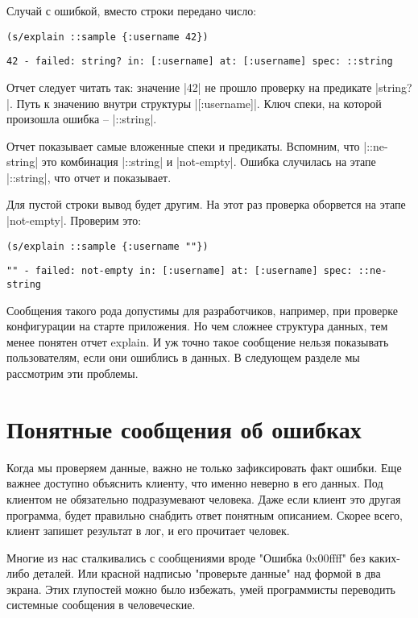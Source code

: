 Случай с ошибкой, вместо строки передано число:

\begin{verbatim}
(s/explain ::sample {:username 42})
\end{verbatim}

\begin{verbatim}
42 - failed: string? in: [:username] at: [:username] spec: ::string
\end{verbatim}

Отчет следует читать так: значение \spverb|42| не прошло проверку на предикате
\spverb|string?|. Путь к значению внутри структуры \spverb|[:username]|. Ключ спеки, на
которой произошла ошибка -- \spverb|::string|.

Отчет показывает самые вложенные спеки и предикаты. Вспомним, что \spverb|::ne-string|
это комбинация \spverb|::string| и \spverb|not-empty|. Ошибка случилась на этапе \spverb|::string|,
что отчет и показывает.

Для пустой строки вывод будет другим. На этот раз проверка оборвется на этапе
\spverb|not-empty|. Проверим это:

\begin{verbatim}
(s/explain ::sample {:username ""})
\end{verbatim}

\begin{verbatim}
"" - failed: not-empty in: [:username] at: [:username] spec: ::ne-string
\end{verbatim}

Сообщения такого рода допустимы для разработчиков, например, при проверке
конфигурации на старте приложения. Но чем сложнее структура данных, тем менее
понятен отчет explain. И уж точно такое сообщение нельзя показывать
пользователям, если они ошиблись в данных. В следующем разделе мы рассмотрим эти
проблемы.

\section{Понятные сообщения об ошибках}

Когда мы проверяем данные, важно не только зафиксировать факт ошибки. Еще важнее
доступно объяснить клиенту, что именно неверно в его данных. Под клиентом не
обязательно подразумевают человека. Даже если клиент это другая программа, будет
правильно снабдить ответ понятным описанием. Скорее всего, клиент запишет
результат в лог, и его прочитает человек.

Многие из нас сталкивались с сообщениями вроде "Ошибка 0x00ffff" без каких-либо
деталей. Или красной надписью "проверьте данные" над формой в два экрана. Этих
глупостей можно было избежать, умей программисты переводить системные сообщения
в человеческие.

